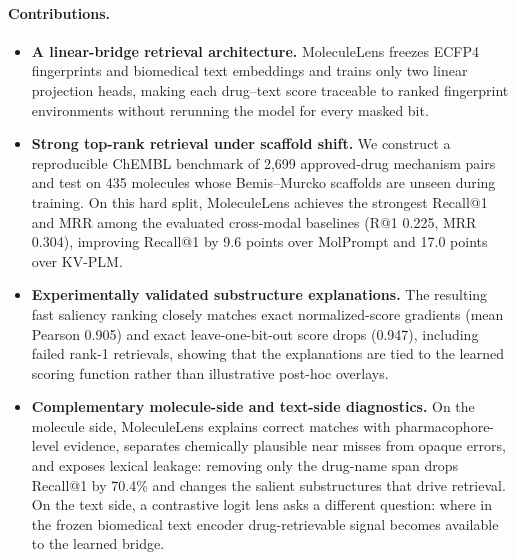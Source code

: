 \documentclass{article}
\begin{document}
\paragraph{Contributions.}
\begin{itemize}
\item \textbf{A linear-bridge retrieval architecture.} MoleculeLens freezes ECFP4 fingerprints and biomedical text embeddings and trains only two linear projection heads, making each drug--text score traceable to ranked fingerprint environments without rerunning the model for every masked bit.
\item \textbf{Strong top-rank retrieval under scaffold shift.} We construct a reproducible ChEMBL benchmark of 2,699 approved-drug mechanism pairs and test on 435 molecules whose Bemis--Murcko scaffolds are unseen during training. On this hard split, MoleculeLens achieves the strongest Recall@1 and MRR among the evaluated cross-modal baselines (R@1 0.225, MRR 0.304), improving Recall@1 by 9.6 points over MolPrompt and 17.0 points over KV-PLM.
\item \textbf{Experimentally validated substructure explanations.} The resulting fast saliency ranking closely matches exact normalized-score gradients (mean Pearson 0.905) and exact leave-one-bit-out score drops (0.947), including failed rank-1 retrievals, showing that the explanations are tied to the learned scoring function rather than illustrative post-hoc overlays.
\item \textbf{Complementary molecule-side and text-side diagnostics.} On the molecule side, MoleculeLens explains correct matches with pharmacophore-level evidence, separates chemically plausible near misses from opaque errors, and exposes lexical leakage: removing only the drug-name span drops Recall@1 by 70.4\% and changes the salient substructures that drive retrieval. On the text side, a contrastive logit lens asks a different question: where in the frozen biomedical text encoder drug-retrievable signal becomes available to the learned bridge.
\end{itemize}
\end{document}
